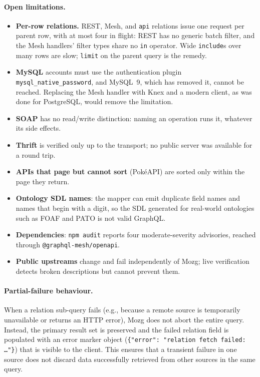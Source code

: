 \documentclass[sigconf,nonacm]{acmart}
\begin{document}
\paragraph{Open limitations.}
\begin{itemize}
  \item \textbf{Per-row relations.}  REST, Mesh, and \texttt{api}
        relations issue one request per parent row, with at most four
        in flight:
        REST has no generic batch filter, and the Mesh handlers' filter
        types share no \texttt{in} operator.  Wide \texttt{include}s
        over many rows are slow; \texttt{limit} on the parent query is
        the remedy.
  \item \textbf{MySQL} accounts must use the authentication plugin
        \texttt{mysql\_native\_password}, and MySQL~9, which has removed
        it, cannot be reached.
        Replacing the Mesh handler with Knex and a modern client, as was
        done for PostgreSQL, would remove the limitation.
  \item \textbf{SOAP} has no read/write distinction: naming an operation
        runs it, whatever its side effects.
  \item \textbf{Thrift} is verified only up to the transport; no public
        server was available for a round trip.
  \item \textbf{APIs that page but cannot sort} (PokéAPI) are sorted
        only within the page they return.
  \item \textbf{Ontology SDL names}: the mapper can emit duplicate field
        names and names that begin with a digit, so the SDL generated
        for real-world ontologies such as FOAF and PATO is not valid
        GraphQL.
  \item \textbf{Dependencies}: \texttt{npm audit} reports four
        moderate-severity advisories, reached through
        \texttt{@graphql-mesh/openapi}.
  \item \textbf{Public upstreams} change and fail independently of Mozg;
        live verification detects broken descriptions but cannot
        prevent them.
\end{itemize}

\paragraph{Partial-failure behaviour.}
When a relation sub-query fails (e.g., because a remote source is
temporarily unavailable or returns an HTTP error), Mozg does not abort
the entire query.  Instead, the primary result set is preserved and
the failed relation field is populated with an error marker object
(\texttt{\{"error": "relation fetch failed: \ldots"\}}) that is
visible to the client.  This ensures that a transient failure in
one source does not discard data successfully retrieved from other
sources in the same query.
\end{document}

